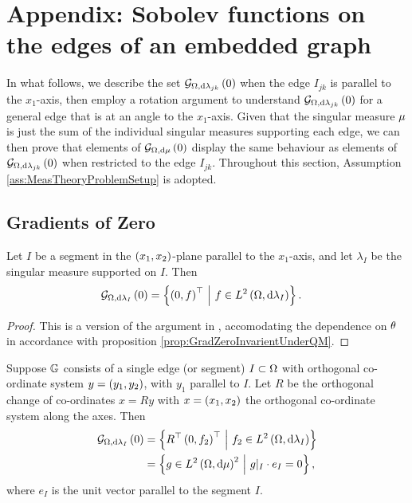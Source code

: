 \section{Appendix: Sobolev functions on the edges of an embedded graph} \label{app:muAnalysis}
In what follows, we describe the set $\mathcal{G}_{ \Omega, \mathrm{d}\lambda_{jk}}\left( 0 \right)$ when the edge $I_{jk}$ is parallel to the $x_1$-axis, then employ a rotation argument to understand $\mathcal{G}_{ \Omega, \mathrm{d}\lambda_{jk}}\left( 0 \right)$ for a general edge that is at an angle to the $x_1$-axis.
Given that the singular measure $\mu$ is just the sum of the individual singular measures supporting each edge, we can then prove that elements of $\mathcal{G}_{ \Omega, \mathrm{d}\mu}\left( 0 \right)$ display the same behaviour as elements of $\mathcal{G}_{ \Omega, \mathrm{d}\lambda_{jk}}\left( 0 \right)$ when restricted to the edge $I_{jk}$.
Throughout this section, Assumption \ref{ass:MeasTheoryProblemSetup} is adopted.

\subsection{Gradients of Zero} \label{appS:muGradZero}
\begin{prop} \label{prop:GradZeroParallelZhikov}
	Let $I$ be a segment in the $\left( x_1,x_2 \right)$-plane parallel to the $x_1$-axis, and let $\lambda_I$ be the singular measure supported on $I$.
	Then 
	\begin{align*}
		\mathcal{G}_{ \Omega, \mathrm{d}\lambda_I}\left( 0 \right) &= 
		\left\{  \left( 0,f \right)^\top	\ \middle\vert \  f\in L^{2}\left( \Omega,\mathrm{d}\lambda_I \right)
		 \right\}.
	\end{align*}
\end{prop}
\begin{proof}
	This is a version of the argument in \cite[Section~3.1]{zhikov2000extension}, accomodating the dependence on $\theta$ in accordance with proposition \ref{prop:GradZeroInvarientUnderQM}.
\end{proof}

\begin{prop}\label{prop:RotationOfEdgeGradients}
	Suppose $\mathbb{G}$ consists of a single edge (or segment) $I\subset\Omega$ with orthogonal co-ordinate system $y=\left( y_1,y_2 \right)$, with $y_1$ parallel to $I$.
	Let $R$ be the orthogonal change of co-ordinates $x=Ry$ with $x=\left( x_1,x_2 \right)$ the orthogonal co-ordinate system along the axes.
	Then
	\begin{align*}
		\mathcal{G}_{ \Omega, \mathrm{d}\lambda_I}\left( 0 \right) 
		&= \left\{  R^{\top} \left( 0,f_2 \right)^\top \ \middle\vert \  f_2\in L^{2}\left( \Omega,\mathrm{d}\lambda_I \right)  \right\} \\
		&= \left\{  g\in L^{2}\left( \Omega,\mathrm{d}\mu \right)^2 \ \middle\vert \  g\vert_{I}\cdot e_{I} =0  \right\},
	\end{align*}
where $e_I$ is the unit vector parallel to the segment $I$.
\end{prop}

